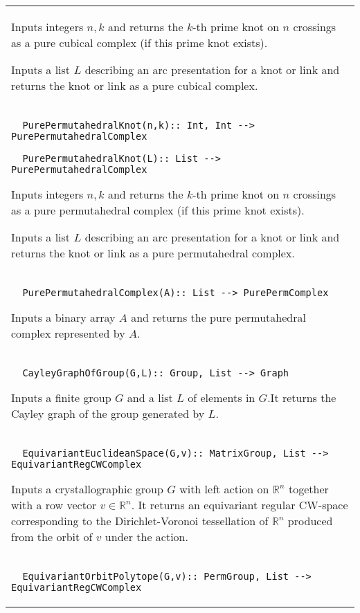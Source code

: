 \documentclass[a4paper,11pt]{report}
\begin{document}
{\begin{center}
\begin{tabular}{|l|}
 

 Inputs integers $n, k$ and returns the $k$-th prime knot on $n$ crossings as a pure cubical complex (if this prime knot exists). 

 Inputs a list $L$ describing an arc presentation for a knot or link and returns the knot or link
as a pure cubical complex. \\
 \index{PurePermutahedralKnot} 
\begin{verbatim}  PurePermutahedralKnot(n,k):: Int, Int --> PurePermutahedralComplex
\end{verbatim}
 
\begin{verbatim}  PurePermutahedralKnot(L):: List --> PurePermutahedralComplex
\end{verbatim}
 

 Inputs integers $n, k$ and returns the $k$-th prime knot on $n$ crossings as a pure permutahedral complex (if this prime knot exists). 

 Inputs a list $L$ describing an arc presentation for a knot or link and returns the knot or link
as a pure permutahedral complex. \\
 \index{PurePermutahedralComplex} 
\begin{verbatim}  PurePermutahedralComplex(A):: List --> PurePermComplex
\end{verbatim}


 

 Inputs a binary array $A$ and returns the pure permutahedral complex represented by $A$. \\
 \index{CayleyGraphOfGroup} 
\begin{verbatim}  CayleyGraphOfGroup(G,L):: Group, List --> Graph
\end{verbatim}


 

 Inputs a finite group $G$ and a list $L$ of elements in $G$.It returns the Cayley graph of the group generated by $L$. \\
 \index{EquivariantEuclideanSpace} 
\begin{verbatim}  EquivariantEuclideanSpace(G,v):: MatrixGroup, List --> EquivariantRegCWComplex
\end{verbatim}


 

 Inputs a crystallographic group $G$ with left action on $\mathbb R^n$ together with a row vector $v \in \mathbb R^n$. It returns an equivariant regular CW-space corresponding to the
Dirichlet-Voronoi tessellation of $\mathbb R^n$ produced from the orbit of $v$ under the action. \\
 \index{EquivariantOrbitPolytope} 
\begin{verbatim}  EquivariantOrbitPolytope(G,v):: PermGroup, List --> EquivariantRegCWComplex
\end{verbatim}



\end{tabular}
\end{center}}
\end{document}
